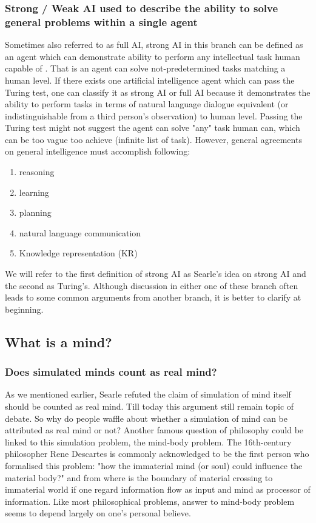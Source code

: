 \documentclass[11pt]{article}
\newcommand{\dr}[1]{{\color{dark-cornflower-blue-2} #1}}
\newenvironment{draft}{\color{dark-cornflower-blue-2}}{\ignorespacesafterend}
\begin{document}
\begin{draft}
\subsubsection*{Strong / Weak AI used to describe the ability to solve general problems within a single agent}

Sometimes also referred to as full AI, strong AI in this branch can be defined as an agent which can demonstrate ability to perform any intellectual task human capable of \cite{kurzweil2005singularity}. That is an agent can solve not-predetermined tasks matching a human level. If there exists one artificial intelligence agent which can pass the Turing test, one can classify it as strong AI or full AI because it demonstrates the ability to perform tasks in terms of natural language dialogue equivalent (or indistinguishable from a third person's observation) to human level. Passing the Turing test might not suggest the agent can solve "any" task human can, which can be too vague too achieve (infinite list of task). However, general agreements on general intelligence must accomplish following:
\begin{enumerate}
\item reasoning
\item learning
\item planning
\item natural language communication
\item Knowledge representation (KR) 
\end{enumerate}

We will refer to the first definition of strong AI as Searle's idea on strong AI and the second as Turing's. Although discussion in either one of these branch often leads to some common arguments from another branch, it is better to clarify at beginning. 
\end{draft}

\subsection{What is a mind?}

\subsubsection*{Does simulated minds count as real mind?}

\dr{
As we mentioned earlier, Searle refuted the claim of simulation of mind itself should be counted as real mind. Till today this argument still remain topic of debate. So why do people waffle about whether a simulation of mind can be attributed as real mind or not? Another famous question of philosophy could be linked to this simulation problem, the mind-body problem. The 16th-century philosopher Rene Descartes is commonly acknowledged to be the first person who formalised this problem: "how the immaterial mind (or soul) could influence the material body?" and from where is the boundary of material crossing to immaterial world if one regard information flow as input and mind as processor of information. Like most philosophical problems, answer to mind-body problem seems to depend largely on one's personal believe.
}
\end{document}
